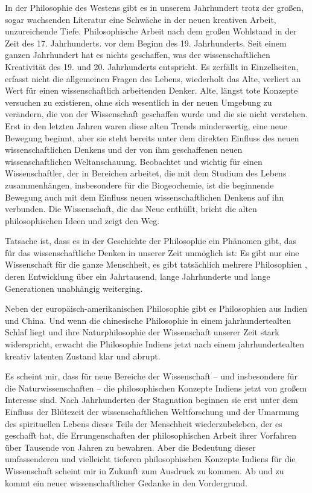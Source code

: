 \documentclass[11pt,a4paper]{book}
\begin{document}
In der Philosophie des Westens gibt es in unserem Jahrhundert trotz der großen, sogar wachsenden Literatur eine Schwäche in der neuen kreativen Arbeit, unzureichende Tiefe. Philosophische Arbeit nach dem großen Wohlstand in der Zeit des 17. Jahrhunderts. vor dem Beginn des 19. Jahrhunderts. Seit einem ganzen Jahrhundert hat es nichts geschaffen, was der wissenschaftlichen Kreativität des 19. und 20. Jahrhunderts entspricht. Es zerfällt in Einzelheiten, erfasst nicht die allgemeinen Fragen des Lebens, wiederholt das Alte, verliert an Wert für einen wissenschaftlich arbeitenden Denker. Alte, längst tote Konzepte versuchen zu existieren, ohne sich wesentlich in der neuen Umgebung zu verändern, die von der Wissenschaft geschaffen wurde und die sie nicht verstehen. Erst in den letzten Jahren waren diese alten Trends minderwertig, eine neue Bewegung beginnt, aber sie steht bereits unter dem direkten Einfluss des neuen wissenschaftlichen Denkens und der von ihm geschaffenen neuen wissenschaftlichen Weltanschauung. Beobachtet und wichtig für einen Wissenschaftler, der in Bereichen arbeitet, die mit dem Studium des Lebens zusammenhängen, insbesondere für die Biogeochemie, ist die beginnende Bewegung auch mit dem Einfluss neuen wissenschaftlichen Denkens auf ihn verbunden. Die Wissenschaft, die das Neue enthüllt, bricht die alten philosophischen Ideen und zeigt den Weg.



Tatsache ist, dass es in der Geschichte der Philosophie ein Phänomen gibt, das für das wissenschaftliche Denken in unserer Zeit unmöglich ist: Es gibt nur eine Wissenschaft für die ganze Menschheit, es gibt tatsächlich mehrere Philosophien , deren Entwicklung über ein Jahrtausend, lange Jahrhunderte und lange Generationen unabhängig weiterging.



Neben der europäisch-amerikanischen Philosophie gibt es Philosophien aus Indien und China. Und wenn die chinesische Philosophie in einem jahrhundertealten Schlaf liegt und ihre Naturphilosophie der Wissenschaft unserer Zeit stark widerspricht, erwacht die Philosophie Indiens jetzt nach einem jahrhundertealten kreativ latenten Zustand klar und abrupt.



Es scheint mir, dass für neue Bereiche der Wissenschaft -- und insbesondere für die Naturwissenschaften -- die philosophischen Konzepte Indiens jetzt von großem Interesse sind. Nach Jahrhunderten der Stagnation beginnen sie erst unter dem Einfluss der Blütezeit der wissenschaftlichen Weltforschung und der Umarmung des spirituellen Lebens dieses Teils der Menschheit wiederzubeleben, der es geschafft hat, die Errungenschaften der philosophischen Arbeit ihrer Vorfahren über Tausende von Jahren zu bewahren. Aber die Bedeutung dieser umfassenderen und vielleicht tieferen philosophischen Konzepte Indiens für die Wissenschaft scheint mir in Zukunft zum Ausdruck zu kommen. Ab und zu kommt ein neuer wissenschaftlicher Gedanke in den Vordergrund.
\end{document}
